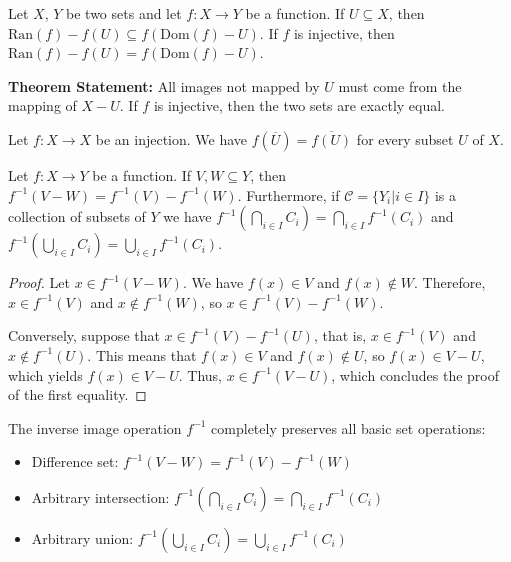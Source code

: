 \documentclass[../main.tex]{subfiles}
\begin{document}
\begin{yellow}
\begin{theorem}
    
Let $X$, $Y$ be two sets and let $f:X\rightarrow Y$ be a function. If $U\subseteq X$, then $\text{Ran}(f)-f(U)\subseteq f(\text{Dom}(f) - U)$. If $f$ is injective, then $\text{Ran}(f)-f(U)=f(\text{Dom}(f)-U)$.

\end{theorem}
\end{yellow}

\textbf{Theorem Statement:} All images not mapped by $U$ must come from the mapping of $X-U$. If $f$ is injective, then the two sets are exactly equal.

\begin{yellow}
\begin{theorem}
    
Let $f:X\rightarrow X$ be an injection. We have $f(\overline U)=\overline{f(U)}$ for every subset $U$ of $X$.

\end{theorem}
\end{yellow}

\begin{yellow}
\begin{theorem}

Let $f:X\rightarrow Y$ be a function. If $V,W\subseteq Y$, then $f^{-1}(V-W)=f^{-1}(V)-f^{-1}(W)$. Furthermore, if $\mathcal{C}=\{Y_i|i\in I\}$ is a collection of subsets of $Y$ we have $f^{-1}(\bigcap_{i\in I}C_i)=\bigcap_{i\in I}f^{-1}(C_i)$ and $f^{-1}(\bigcup_{i\in I}C_i)=\bigcup_{i\in I}f^{-1}(C_i)$.

\end{theorem}
\end{yellow}

\begin{proof}

Let $x \in f^{-1}(V-W)$. We have $f(x) \in V$ and $f(x) \notin W$. Therefore, $x \in f^{-1}(V)$ and $x \notin f^{-1}(W)$, so $x \in f^{-1}(V)-f^{-1}(W)$. 

Conversely, suppose that $x \in f^{-1}(V)-f^{-1}(U)$, that is, $x \in f^{-1}(V)$ and $x \notin f^{-1}(U)$. This means that $f(x) \in V$ and $f(x) \notin U$, so $f(x) \in V-U$, which yields $f(x) \in V-U$. Thus, $x \in f^{-1}(V-U)$, which concludes the proof of the first equality.
\end{proof}

\begin{green}

The inverse image operation $f^{-1}$ completely preserves all basic set operations:
\begin{itemize}
    \item Difference set: $f^{-1}(V - W) = f^{-1}(V) - f^{-1}(W)$
    \item Arbitrary intersection: $f^{-1}\left(\bigcap_{i\in I} C_{i}\right) = \bigcap_{i\in I} f^{-1}(C_{i})$
    \item Arbitrary union: $f^{-1}\left(\bigcup_{i\in I} C_{i}\right) = \bigcup_{i\in I} f^{-1}(C_{i})$
\end{itemize}

\end{green}
\end{document}
